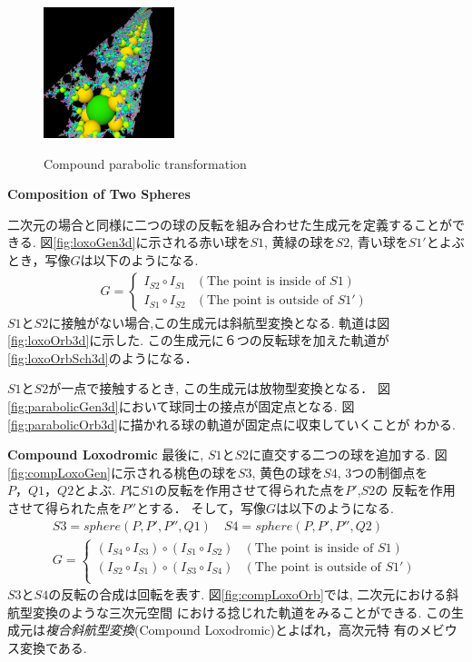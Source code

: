 \begin{figure}[h!tbp]
\begin{minipage}{0.49\hsize}
  \begin{minipage}{0.24\hsize}
   \center
   \includegraphics[width=1.5in, height=1.5in, keepaspectratio]{../img/klein/3diis/compParabolicOrb.pdf}
   \label{fig:compParabolicOrb}
  \end{minipage}
  \hspace*{\fill}
  \caption{Compound parabolic transformation}
  \label{fig:compParabolic}
 \end{minipage}
\end{figure}

\noindent\textbf{Composition of Two Spheres}

二次元の場合と同様に二つの球の反転を組み合わせた生成元を定義することができる.
図\ref{fig:loxoGen3d}に示される赤い球を$S1$, 黄緑の球を$S2$,
青い球を$S1'$とよぶとき，写像$G$は以下のようになる.
\begin{align*}
G =
\begin{cases}
 I_{S2} \circ I_{S1} & (\text{The point is inside of } S1) \\
 I_{S1} \circ I_{S2} & (\text{The point is outside of }S1')
\end{cases}
\end{align*}
$S1$と$S2$に接触がない場合,この生成元は斜航型変換となる.
軌道は図\ref{fig:loxoOrb3d}に示した.
この生成元に６つの反転球を加えた軌道が\ref{fig:loxoOrbSch3d}のようになる．

$S1$と$S2$が一点で接触するとき, この生成元は放物型変換となる．
図\ref{fig:parabolicGen3d}において球同士の接点が固定点となる.
図\ref{fig:parabolicOrb3d}に描かれる球の軌道が固定点に収束していくことが
わかる.

\noindent\textbf{Compound Loxodromic}
最後に, $S1$と$S2$に直交する二つの球を追加する.
図\ref{fig:compLoxoGen}に示される桃色の球を$S3$, 黄色の球を$S4$,
3つの制御点を$P，Q1，Q2$とよぶ.
$P$に$S1$の反転を作用させて得られた点を$P'$,$S2$の
反転を作用させて得られた点を$P''$とする．
そして，写像$G$は以下のようになる.
\begin{align*}
S3 = sphere(P, P', P'', Q1) \quad
S4 = sphere(P, P', P'', Q2) \\
G =
\begin{cases}
 (I_{S4} \circ I_{S3}) \circ (I_{S1} \circ I_{S2}) & (\text{The point is inside of } S1) \\
 (I_{S2} \circ I_{S1}) \circ (I_{S3} \circ I_{S4}) & (\text{The point is
 outside of } S1')\\
\end{cases}
\end{align*}
$S3$と$S4$の反転の合成は回転を表す.
図\ref{fig:compLoxoOrb}では, 二次元における斜航型変換のような三次元空間
における捻じれた軌道をみることができる.
この生成元は\emph{複合斜航型変換}(Compound Loxodromic)とよばれ，高次元特
有のメビウス変換である.

